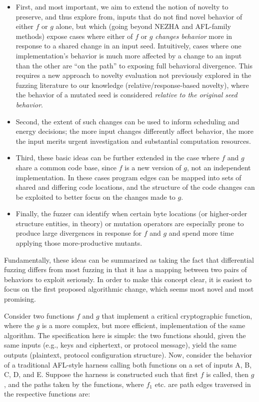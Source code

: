\begin{itemize}
  \item First, and most important, we aim to extend the notion of
    novelty to preserve, and thus explore from, inputs that do not find novel
    behavior of either $f$ or $g$ alone, but which (going beyond NEZHA and
    AFL-family methods) expose cases where either of $f$ or $g$
    \emph{changes behavior} more in response to a shared change in an input
    seed.  Intuitively, cases where one implementation's behavior is
    much more affected by a change to an input than the other are ``on
    the path'' to exposing full behavioral divergence.  This requires
    a new approach to novelty evaluation not previously explored in
    the fuzzing literature to our knowledge (relative/response-based
    novelty), where the behavior of a mutated seed is considered
    \emph{relative to the original seed behavior}.
    \item Second, the extent of such changes can be used to inform
      scheduling and energy decisions; the more input changes
      differently affect behavior, the more the input merits urgent
      investigation and substantial computation resources.
     \item Third, these basic ideas can be further extended in the
       case where $f$ and $g$ share a common code base, since $f$ is a new
       version of $g$, not an independent implementation.  In these
       cases program edges can be mapped into sets of shared and
       differing code locations, and the structure of the code changes
       can be exploited to better focus on the changes made to $g$.
       \item Finally, the fuzzer can identify when certain byte
         locations (or higher-order structure entities, in theory) or
         mutation operators are especially prone to produce large
         divergences in response for $f$ and $g$ and spend more time
         applying those more-productive mutants.
       \end{itemize}

 Fundamentally, these ideas can be summarized as taking the fact that
 differential fuzzing differs from most fuzzing in that it has a
 mapping between two pairs of behaviors to exploit seriously.  In
 order to make this concept clear, it is easiest to focus on the first
 proposed algorithmic change, which seems most novel and most
 promising.

 Consider two functions $f$ and $g$ that implement a critical cryptographic function,
 where the $g$ is a more complex, but more efficient,
 implementation of the same algorithm.  The specification here is simple:  the two
 functions should, given the same inputs (e.g., keys and ciphertext,
 or protocol message), yield
 the same outputs (plaintext, protocol configuration structure).
 Now, consider the behavior of a traditional AFL-style harness calling
 both functions on a set of inputs A, B, C, D, and E.  Suppose the
 harness is constructed such that first $f$ is called, then $g$, and
 the paths taken by the functions, where $f_1$ etc. are path edges traversed
 in the respective functions are:

